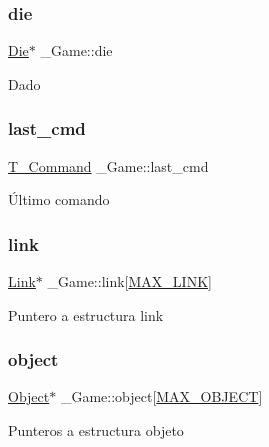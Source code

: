 \subsubsection{\texorpdfstring{die}{die}}
{\footnotesize\ttfamily \hyperlink{die_8h_a892f0b0bf81d69a1f7a14ea238e36dd3}{Die}$\ast$ \+\_\+\+Game\+::die}

Dado \mbox{\label{struct__Game_a27727b50ea0904a1fe9e1c55c27f2cf1}} 
\subsubsection{\texorpdfstring{last\+\_\+cmd}{last\_cmd}}
{\footnotesize\ttfamily \hyperlink{command_8h_a0473597db8c45c0289b6b8e2f8abbe32}{T\+\_\+\+Command} \+\_\+\+Game\+::last\+\_\+cmd}

Último comando \mbox{\label{struct__Game_acde062499c7180ecaf3bd36ba64385c6}} 
\subsubsection{\texorpdfstring{link}{link}}
{\footnotesize\ttfamily \hyperlink{link_8h_ae3b299941e67be6971bfd64a25505eff}{Link}$\ast$ \+\_\+\+Game\+::link\mbox{[}\hyperlink{game_8h_abfa744c8ca5b46f7f2a10aea53a4ec59}{M\+A\+X\+\_\+\+L\+I\+NK}\mbox{]}}

Puntero a estructura link \mbox{\label{struct__Game_a8ade6d831e4710c40b0d61004bbd1585}} 
\subsubsection{\texorpdfstring{object}{object}}
{\footnotesize\ttfamily \hyperlink{object_8h_a7f8bbcda919b65ce67f92fba08e0212f}{Object}$\ast$ \+\_\+\+Game\+::object\mbox{[}\hyperlink{game_8h_a7083b26c57d956d72197b9428d8e4894}{M\+A\+X\+\_\+\+O\+B\+J\+E\+CT}\mbox{]}}

Punteros a estructura objeto \mbox{\label{struct__Game_a31406605782d71ec00c4bf258ea76267}} 
